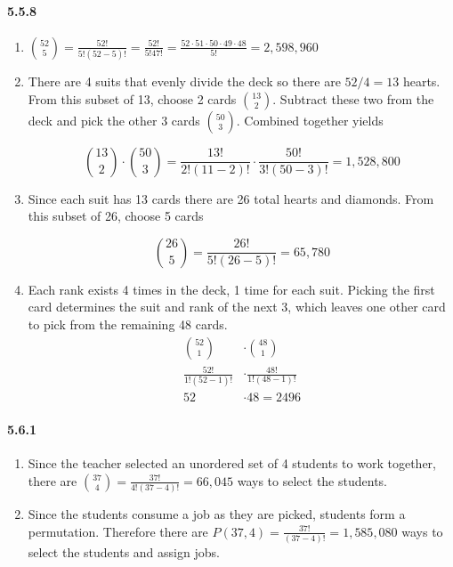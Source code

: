 \documentclass[11pt, letterpaper, twocolumn, fleqn]{article}
\begin{document}
\paragraph{5.5.8}
\begin{enumerate}
  \item $\binom{52}{5} = \frac{52!}{5!(52-5)!} = \frac{52!}{5!47!} = \frac{52 \cdot 51 \cdot 50 \cdot 49 \cdot 48}{5!} = 2,598,960$
  \item There are 4 suits that evenly divide the deck so there are $52/4 = 13$ hearts. From this subset of 13, choose 2 cards $\binom{13}{2}$. Subtract these two from the deck and pick the other 3 cards $\binom{50}{3}$. Combined together yields 
  
    $$\binom{13}{2} \cdot \binom{50}{3} = \frac{13!}{2!(11-2)!} \cdot \frac{50!}{3!(50-3)!} = 1,528,800$$
    
  \item Since each suit has 13 cards there are 26 total hearts and diamonds. From this subset of 26, choose 5 cards 
  
    $$\binom{26}{5} = \frac{26!}{5!(26-5)!} = 65,780$$
    
  \item Each rank exists 4 times in the deck, 1 time for each suit. Picking the first card determines the suit and rank of the next 3, which leaves one other card to pick from the remaining 48 cards.
    \begin{align*}
      \binom{52}{1} &\cdot \binom{48}{1} \\
      \frac{52!}{1!(52-1)!} &\cdot \frac{48!}{1!(48-1)!} \\
      52 &\cdot 48 = 2496 
    \end{align*}
\end{enumerate}

\paragraph{5.6.1}
\begin{enumerate}
  \item Since the teacher selected an unordered set of 4 students to work together, there are $\binom{37}{4} = \frac{37!}{4!(37-4)!}=66,045$ ways to select the students.
  \item Since the students consume a job as they are picked, students form a permutation. Therefore there are $P(37,4) = \frac{37!}{(37-4)!} = 1,585,080$ ways to select the students and assign jobs.
\end{enumerate}
\end{document}
